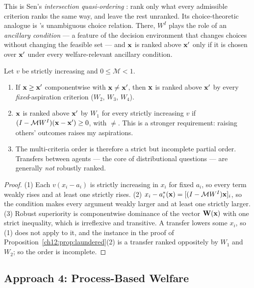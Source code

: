 \documentclass[../structural_economics_book.tex]{subfiles}
\begin{document}
This is Sen's \textit{intersection quasi-ordering} \citep{sen1970collective}: rank only what every admissible criterion ranks the same way, and leave the rest unranked. Its choice-theoretic analogue is \citeauthor{bernheim2009beyond}'s \citeyearpar{bernheim2009beyond} unambiguous choice relation. There, $W^I$ plays the role of an \textit{ancillary condition} --- a feature of the decision environment that changes choices without changing the feasible set --- and $\mathbf{x}$ is ranked above $\mathbf{x}'$ only if it is chosen over $\mathbf{x}'$ under every welfare-relevant ancillary condition.

\begin{proposition}\label{ch12:prop:robust}
Let $v$ be strictly increasing and $0 \le \mathcal{M} < 1$.
\begin{enumerate}
\item If $\mathbf{x} \geq \mathbf{x}'$ componentwise with $\mathbf{x} \neq \mathbf{x}'$, then $\mathbf{x}$ is ranked above $\mathbf{x}'$ by every \textit{fixed}-aspiration criterion ($W_2$, $W_3$, $W_4$).
\item $\mathbf{x}$ is ranked above $\mathbf{x}'$ by $W_1$ for every strictly increasing $v$ if $(I - \mathcal{M}W^I)(\mathbf{x} - \mathbf{x}') \geq 0$, with $\neq$. This is a stronger requirement: raising others' outcomes raises my aspirations.
\item The multi-criteria order is therefore a strict but incomplete partial order. Transfers between agents --- the core of distributional questions --- are generally \textit{not} robustly ranked.
\end{enumerate}
\end{proposition}

\begin{proof}
(1) Each $v(x_i - a_i)$ is strictly increasing in $x_i$ for fixed $a_i$, so every term weakly rises and at least one strictly rises. (2) $x_i - a_i^*(\mathbf{x}) = [(I - \mathcal{M}W^I)\mathbf{x}]_i$, so the condition makes every argument weakly larger and at least one strictly larger. (3) Robust superiority is componentwise dominance of the vector $\mathbf{W}(\mathbf{x})$ with one strict inequality, which is irreflexive and transitive. A transfer lowers some $x_i$, so (1) does not apply to it, and the instance in the proof of Proposition~\ref{ch12:prop:laundered}(2) is a transfer ranked oppositely by $W_1$ and $W_2$; so the order is incomplete.
\end{proof}


\subsection{Approach 4: Process-Based Welfare}
\end{document}
